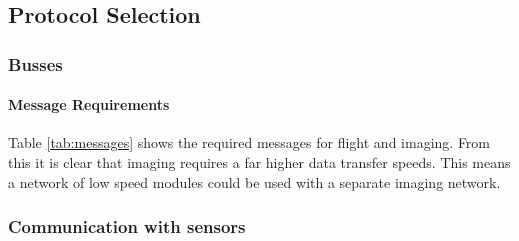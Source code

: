 \subsection{Protocol Selection}\label{sub_section:tgt_protocol_selection}

\subsubsection{Busses}\label{sub_sub_section:tgt_requirements}
\paragraph{Message Requirements}
Table \ref{tab:messages} shows the required messages for flight and imaging. From this it is clear that imaging requires a far higher data transfer speeds. This means a network of low speed modules could be used with a separate imaging network.



 
\subsubsection{Communication with sensors}\label{sub_sub_section:tgt_comms_sensors}




